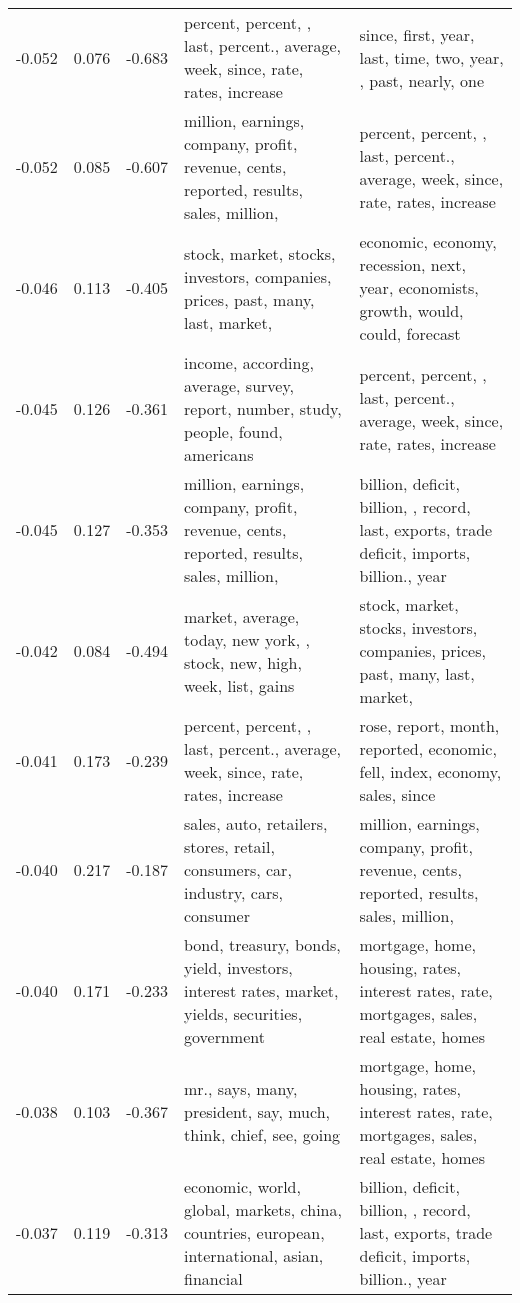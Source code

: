 \begin{tabular}{cccp{5cm}p{5cm}}
-0.052 & 0.076 & -0.683 & percent, percent, , last, percent., average, week, since, rate, rates, increase & since, first, year, last, time, two, year, , past, nearly, one \\
-0.052 & 0.085 & -0.607 & million, earnings, company, profit, revenue, cents, reported, results, sales, million,  & percent, percent, , last, percent., average, week, since, rate, rates, increase \\
-0.046 & 0.113 & -0.405 & stock, market, stocks, investors, companies, prices, past, many, last, market,  & economic, economy, recession, next, year, economists, growth, would, could, forecast \\
-0.045 & 0.126 & -0.361 & income, according, average, survey, report, number, study, people, found, americans & percent, percent, , last, percent., average, week, since, rate, rates, increase \\
-0.045 & 0.127 & -0.353 & million, earnings, company, profit, revenue, cents, reported, results, sales, million,  & billion, deficit, billion, , record, last, exports, trade deficit, imports, billion., year \\
-0.042 & 0.084 & -0.494 & market, average, today, new york, , stock, new, high, week, list, gains & stock, market, stocks, investors, companies, prices, past, many, last, market,  \\
-0.041 & 0.173 & -0.239 & percent, percent, , last, percent., average, week, since, rate, rates, increase & rose, report, month, reported, economic, fell, index, economy, sales, since \\
-0.040 & 0.217 & -0.187 & sales, auto, retailers, stores, retail, consumers, car, industry, cars, consumer & million, earnings, company, profit, revenue, cents, reported, results, sales, million,  \\
-0.040 & 0.171 & -0.233 & bond, treasury, bonds, yield, investors, interest rates, market, yields, securities, government & mortgage, home, housing, rates, interest rates, rate, mortgages, sales, real estate, homes \\
-0.038 & 0.103 & -0.367 & mr., says, many, president, say, much, think, chief, see, going & mortgage, home, housing, rates, interest rates, rate, mortgages, sales, real estate, homes \\
-0.037 & 0.119 & -0.313 & economic, world, global, markets, china, countries, european, international, asian, financial & billion, deficit, billion, , record, last, exports, trade deficit, imports, billion., year \\

\end{tabular}
